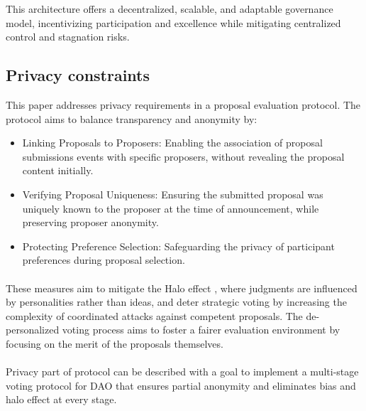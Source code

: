 \documentclass{article}
\begin{document}
\begin{CJK}{UTF8}{gbsn}
\begin{multicols}{2}
            This architecture offers a decentralized, scalable, and adaptable governance model, incentivizing participation and excellence while mitigating centralized control and stagnation risks.


            \subsection{Privacy constraints}

            This paper addresses privacy requirements in a proposal evaluation protocol. The protocol aims to balance transparency and anonymity by:
            \begin{itemize}[nosep]
                \item Linking Proposals to Proposers: Enabling the association of proposal submissions events with specific proposers, without revealing the proposal content initially.
                \item Verifying Proposal Uniqueness: Ensuring the submitted proposal was uniquely known to the proposer at the time of announcement, while preserving proposer anonymity.
                \item Protecting Preference Selection: Safeguarding the privacy of participant preferences during proposal selection.

            \end{itemize}
            \paragraph{}

            These measures aim to mitigate the Halo effect \cite{Verhulst2010}\cite{Nisbett1977}, where judgments are influenced by personalities rather than ideas, and deter strategic voting by increasing the complexity of coordinated attacks against competent proposals. The de-personalized voting process aims to foster a fairer evaluation environment by focusing on the merit of the proposals themselves.

            \paragraph{}
            Privacy part of protocol can be described with a goal to implement a multi-stage voting protocol for DAO that ensures partial anonymity and eliminates bias and halo effect at every stage.


\end{multicols}
\end{CJK}
\end{document}

